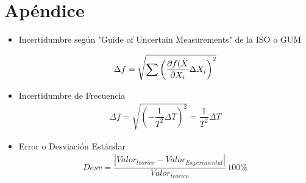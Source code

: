 
\section{Apéndice}\label{sec:apendice}
\begin{itemize}
    \item Incertidumbre según "Guide of Uncertain Measurements" de la ISO o GUM

        \begin{gather}
            \Delta f=\sqrt{\sum\left( \dfrac{\partial f(\Bar{X} }{\partial X_i} \Delta X_i\right)^2}
        \end{gather}


    \item Incertidumbre de Frecuencia
        \begin{gather}
            \Delta f = \sqrt{\left(-\dfrac{1}{T^2}\Delta T\right)^2}=\dfrac{1}{T^2}\Delta T
            \label{eqn:delta_frecuencia}
        \end{gather}

        
    \item Error o Desviación Estándar
        \begin{gather}
            Desv=\dfrac{|Valor_{teorico}-Valor_{Experimental}|}{Valor_{teorico}} \, 100\%
            \label{eqn:desviación}
        \end{gather}
        
\end{itemize}

\newpage